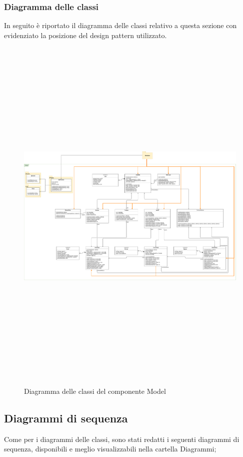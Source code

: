 		\subsubsection{Diagramma delle classi}
		In seguito è riportato il diagramma delle classi relativo a questa sezione con evidenziato la posizione del design pattern utilizzato.
	
\clearpage	
	\begin{figure}[h]
		\centering
			\includegraphics[angle=90, origin=c, height=7in]{./Diagrammi/DiagrammaModel.pdf}
		\caption{Diagramma delle classi del componente Model}
		\label{}
	\end{figure}
		\clearpage
	
	\subsection{Diagrammi di sequenza}
	Come per i diagrammi delle classi, sono stati redatti i seguenti diagrammi di sequenza, disponibili e meglio visualizzabili nella cartella Diagrammi;
	

